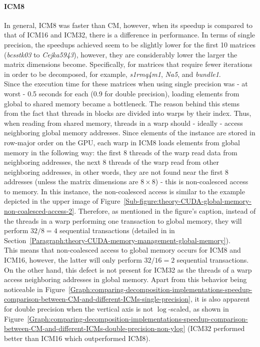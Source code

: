 \paragraph{ICM8} In general, ICM8 was faster than CM, however, when its speedup is compared to that of ICM16 and ICM32, there is a difference in performance. In terms of single precision, the speedups achieved seem to be slightly lower for the first 10 matrices (\textit{bcsstk03} to \textit{Cejka5943}), however, they are considerably lower the larger the matrix dimensions become. Specifically, for matrices that require fewer iterations in order to be decomposed, for example, \textit{s1rmq4m1}, \textit{Na5}, and \textit{bundle1}. \\
Since the execution time for these matrices when using single precision was - at worst - 0.5 seconds for each (0.9 for double precision), loading elements from global to shared memory became a bottleneck. The reason behind this stems from the fact that threads in blocks are divided into warps by their  index. Thus, when reading from shared memory, threads in a warp should - ideally - access neighboring global memory addresses. Since elements of the  instance are stored in row-major order on the GPU, each warp in ICM8 loads elements from global memory in the following way: the first 8 threads of the warp read data from neighboring addresses, the next 8 threads of the warp read from other neighboring addresses, in other words, they are not found near the first 8 addresses (unless the matrix dimensions are $ 8\times 8 $) - this is non-coalesced access to memory. In this instance, the non-coalesced access is similar to the example depicted in the upper image of Figure~\ref{Sub-figure:theory-CUDA-global-memory-non-coalesced-access-2}. Therefore, as mentioned in the figure's caption, instead of the threads in a warp performing one transaction to global memory, they will perform $ 32/8 = 4 $ sequential transactions (detailed in \textit{} in Section~\ref{Paragraph:theory-CUDA-memory-management-global-memory}). \\
This means that non-coalesced access to global memory occurs for ICM8 and ICM16, however, the latter will only perform $ 32/16 = 2 $ sequential transactions. On the other hand, this defect is not present for ICM32 as the threads of a warp access  neighboring addresses in global memory. Apart from this behavior being noticeable in Figure~\ref{Graph:comparing-decomposition-implementations-speedup-comparison-between-CM-and-different-ICMs-single-precision}, it is also apparent for double precision when the vertical axis is not $ \log $-scaled, as shown in Figure~\ref{Graph:comparing-decomposition-implementations-speedup-comparison-between-CM-and-different-ICMs-double-precision-non-ylog} (ICM32 performed better than ICM16 which outperformed ICM8).

